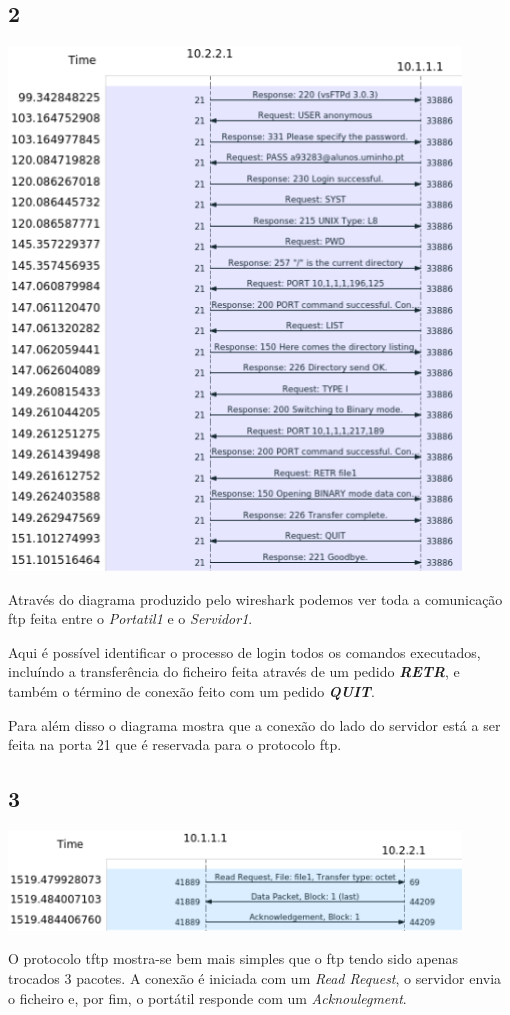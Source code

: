 \documentclass{article}
\begin{document}
        \subsection*{2}
            {
                \centering
                \includegraphics[width=12cm]{images/ftp-flow-graph.png}
                \par
            }
                Através do diagrama produzido pelo wireshark podemos ver toda a comunicação ftp feita entre o \textit{Portatil1} e o \textit{Servidor1}.

            Aqui é possível identificar o processo de login todos os comandos executados, incluíndo a transferência do ficheiro feita através de um pedido \textbf{\textit{RETR}}, e também o término de conexão
            feito com um pedido \textbf{\textit{QUIT}}.
                
                Para além disso o diagrama mostra que a conexão do lado do servidor está a ser feita na porta 21 que é reservada para o protocolo ftp.
        \subsection*{3}
            {
                \centering
                \includegraphics[width=12cm]{images/tftp-wireshark-flow-graph.png}
                \par
            }
                O protocolo tftp mostra-se bem mais simples que o ftp tendo sido apenas trocados 3 pacotes.
            A conexão é iniciada com um \textit{Read Request}, o servidor envia o ficheiro e, por fim, o portátil responde com um \textit{Acknoulegment}.
\end{document}
